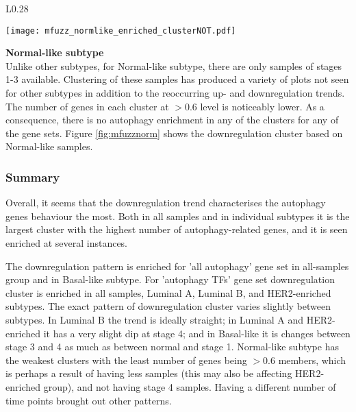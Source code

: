         
        \begin{wrapfigure}{L}{0.28\textwidth}
        \hfill
        \captionsetup{justification=centering}
        \centerline{ \texttt{[image: mfuzz\_normlike\_enriched\_clusterNOT.pdf]}}
        \vspace*{-8mm}
        \caption{\label{fig:mfuzznorm}Normal-like\newline downregulation cluster}
        \end{wrapfigure}
      
        \textbf{Normal-like subtype}\\ 
        Unlike other subtypes, for Normal-like subtype, there are only samples of stages 1-3 available. Clustering of these samples has produced a variety of plots not seen for other subtypes in addition to the reoccurring up- and downregulation trends. The number of genes in each cluster at $>0.6$ level is noticeably lower.  As a consequence, there is no autophagy enrichment in any of the clusters for any of the gene sets. Figure \ref{fig:mfuzznorm} shows the downregulation cluster based on Normal-like samples. 
        \newline
        \newline
        \newline
        

    \subsubsection{Summary}
    
    Overall, it seems that the downregulation trend characterises the autophagy genes behaviour the most. Both in all samples and in individual subtypes it is the largest cluster with the highest number of autophagy-related genes, and it is seen enriched at several instances. 
    
    The downregulation pattern is enriched for 'all autophagy' gene set in all-samples group and in Basal-like subtype. For 'autophagy TFs' gene set downregulation cluster is enriched in all samples, Luminal A, Luminal B, and HER2-enriched subtypes. The exact pattern of downregulation cluster varies slightly between subtypes. In Luminal B the trend is ideally straight; in Luminal A and HER2-enriched it has a very slight dip at stage 4; and in Basal-like it is changes between stage 3 and 4 as much as between normal and stage 1. Normal-like subtype has the weakest clusters with the least number of genes being $>0.6$ members, which is perhaps a result of having less samples (this may also be affecting HER2-enriched group), and not having stage 4 samples. Having a different number of time points brought out other patterns. 
    
